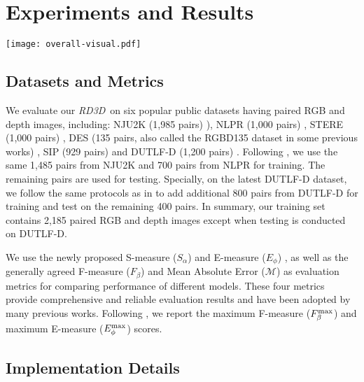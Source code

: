 \documentclass[letterpaper]{article}
\def\ourmodel{\emph{RD3D}}
\begin{document}
\section{Experiments and Results}

\begin{figure*}
	\centering
	\texttt{[image: overall-visual.pdf]}
	\vspace{-0.6cm}
	\caption{\small Qualitative comparisons of \ourmodel~with state-of-the-art (SOTA) methods. ``GT'' indicates the ground truth.}\vspace{-0.3cm}
	\label{fig4}
\end{figure*}


\subsection{Datasets and Metrics}
We evaluate our \ourmodel~on six popular public datasets having paired RGB and depth images, including: NJU2K (1,985 pairs) \cite{ju2014depth}), NLPR (1,000 pairs) \cite{peng2014rgbd}, STERE (1,000 pairs) \cite{niu2012leveraging}, DES (135 pairs, also called the RGBD135 dataset in some previous works) \cite{cheng2014depth}, SIP (929 pairs) \cite{fan2020rethinking} and DUTLF-D (1,200 pairs) \cite{piao2019depth}. Following \cite{chen2018progressively,chen2019multi,han2017cnns}, we use the same 1,485 pairs from NJU2K and 700 pairs from NLPR for training. The remaining pairs are used for testing. Specially, on the latest DUTLF-D dataset, we follow the same protocols as in \cite{piao2019depth,zhao2020single,piao2020a2dele,li2020rgb,ji2020accurate} to add additional 800 pairs from DUTLF-D for training and test on the remaining 400 pairs. In summary, our training set contains 2,185 paired RGB and depth images except when testing is conducted on DUTLF-D.

We use the newly proposed S-measure ($S_\alpha$) \cite{fan2017structure} and E-measure ($E_\phi$) \cite{fan2018enhanced}, as well as the generally agreed F-measure ($F_\beta$) \cite{borji2015salient} and Mean Absolute Error ($\mathcal{M}$) \cite{perazzi2012saliency} as evaluation metrics for comparing performance of different models. These four metrics provide comprehensive and reliable evaluation results and have been adopted by many previous works. Following \cite{fu2020jl}, we report the maximum F-measure ($F_\beta^{\rm max}$) and maximum E-measure ($E_\phi^{\rm max}$) scores.

\subsection{Implementation Details}
\end{document}
